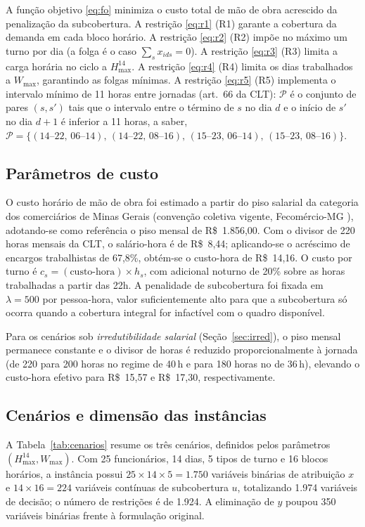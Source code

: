 \documentclass[12pt,a4paper]{article}
\begin{document}
A função objetivo \eqref{eq:fo} minimiza o custo total de mão de obra
acrescido da penalização da subcobertura. A restrição \eqref{eq:r1} (R1)
garante a cobertura da demanda em cada bloco horário. A restrição
\eqref{eq:r2} (R2) impõe no máximo um turno por dia (a folga é o caso $\sum_s
x_{ids} = 0$). A restrição \eqref{eq:r3} (R3) limita a carga horária no ciclo
a $H_{\max}^{14}$. A restrição \eqref{eq:r4} (R4) limita os dias trabalhados a
$W_{\max}$, garantindo as folgas mínimas. A restrição \eqref{eq:r5} (R5)
implementa o intervalo mínimo de 11 horas entre jornadas (art.~66 da CLT):
$\mathcal{P}$ é o conjunto de pares $(s,s')$ tais que o intervalo entre o
término de $s$ no dia $d$ e o início de $s'$ no dia $d+1$ é inferior a 11
horas, a saber, $\mathcal{P} = \{(\text{14--22},\,\text{06--14}),\,
(\text{14--22},\,\text{08--16}),\, (\text{15--23},\,\text{06--14}),\,
(\text{15--23},\,\text{08--16})\}$.

\subsection{Parâmetros de custo}

O custo horário de mão de obra foi estimado a partir do piso salarial da
categoria dos comerciários de Minas Gerais (convenção coletiva vigente,
Fecomércio-MG \cite{fecomercio}), adotando-se como referência o piso mensal
de R\$~1.856,00. Com o divisor de 220 horas mensais da CLT, o salário-hora é
de R\$~8,44; aplicando-se o acréscimo de encargos trabalhistas de 67,8\%,
obtém-se o custo-hora de R\$~14,16. O custo por turno é $c_s =
(\text{custo-hora}) \times h_s$, com adicional noturno de 20\% sobre as horas
trabalhadas a partir das 22h. A penalidade de subcobertura foi fixada em
$\lambda = 500$ por pessoa-hora, valor suficientemente alto para que a
subcobertura só ocorra quando a cobertura integral for infactível com o
quadro disponível.

Para os cenários sob \emph{irredutibilidade salarial}
(Seção~\ref{sec:irred}), o piso mensal permanece constante e o divisor de
horas é reduzido proporcionalmente à jornada (de 220 para 200 horas no regime
de 40\,h e para 180 horas no de 36\,h), elevando o custo-hora efetivo para
R\$~15,57 e R\$~17,30, respectivamente.

\subsection{Cenários e dimensão das instâncias}

A Tabela~\ref{tab:cenarios} resume os três cenários, definidos pelos
parâmetros $(H_{\max}^{14}, W_{\max})$. Com 25 funcionários, 14 dias, 5 tipos
de turno e 16 blocos horários, a instância possui $25 \times 14 \times 5 =
1.750$ variáveis binárias de atribuição $x$ e $14 \times 16 = 224$ variáveis
contínuas de subcobertura $u$, totalizando 1.974 variáveis de decisão; o
número de restrições é de 1.924. A eliminação de $y$ poupou 350 variáveis
binárias frente à formulação original.
\end{document}
